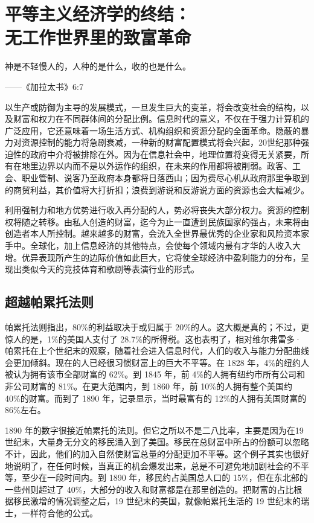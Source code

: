 \chapter[平等主义经济学的终结]{平等主义经济学的终结：\\ 无工作世界里的致富革命}

\begin{tcolorbox}
神是不轻慢人的，人种的是什么，收的也是什么。
\begin{flushright}
——《加拉太书》6:7 
\end{flushright} 
\end{tcolorbox}

以生产或防御为主导的发展模式，一旦发生巨大的变革，将会改变社会的结构，以及财富和权力在不同群体间的分配比例。信息时代的意义，不仅在于强力计算机的广泛应用，它还意味着一场生活方式、机构组织和资源分配的全面革命。隐蔽的暴力对资源控制的能力将急剧衰减，一种新的财富配置模式将会兴起，20世纪那种强迫性的政府中介将被排除在外。因为在信息社会中，地理位置将变得无关紧要，所有在地里边界以内而不是以外运作的组织，在未来的作用都将被削弱。政客、工会、职业管制、说客乃至政府本身都将日落西山；因为费尽心机从政府那里争取到的商贸利益，其价值将大打折扣；浪费到游说和反游说方面的资源也会大幅减少。

利用强制力和地方优势进行收入再分配的人，势必将丧失大部分权力。资源的控制权将随之转移。由私人创造的财富，迄今为止一直遭到民族国家的强占，未来将由创造者本人所控制。越来越多的财富，会流入全世界最优秀的企业家和风险资本家手中。全球化，加上信息经济的其他特点，会使每个领域内最有才华的人收入大增。优异表现所产生的边际价值如此巨大，它将使全球经济中盈利能力的分布，呈现出类似今天的竞技体育和歌剧等表演行业的形式。

\section{超越帕累托法则}

帕累托法则指出，80\%的利益取决于或归属于 20\%的人。这大概是真的；不过，更惊人的是，1\%的美国人支付了 28.7\%的所得税。这也表明了，相对维尔弗雷多·帕累托在上个世纪末的观察，随着社会进入信息时代，人们的收入与能力分配曲线会更加倾斜。现在的人已经很习惯财富上的巨大不平等。在 1828 年，4\%的纽约人被认为拥有该市全部财富的 62\%。到 1845 年，前 4\%的人拥有纽约市所有公司和非公司财富的 81\%。在更大范围内，到 1860 年，前 10\%的人拥有整个美国约 40\%的财富。而到了 1890 年，记录显示，当时最富有的 12\%的人拥有美国财富的 86\%左右。

1890 年的数字很接近帕累托的法则。但它之所以不是二八比率，主要是因为在19 世纪末，大量身无分文的移民涌入到了美国。移民在总财富中所占的份额可以忽略不计，因此，他们的加入自然使财富总量的分配更加不平等。这个例子其实也很好地说明了，在任何时候，当真正的机会爆发出来，总是不可避免地加剧社会的不平等，至少在一段时间内。到 1890 年，移民约占美国总人口的 15\%，但在东北部的一些州则超过了 40\%，大部分的收入和财富都是在那里创造的。把财富的占比根据移民激增的情况调整之后，19 世纪末的美国，就像帕累托生活的 19 世纪末的瑞士，一样符合他的公式。

